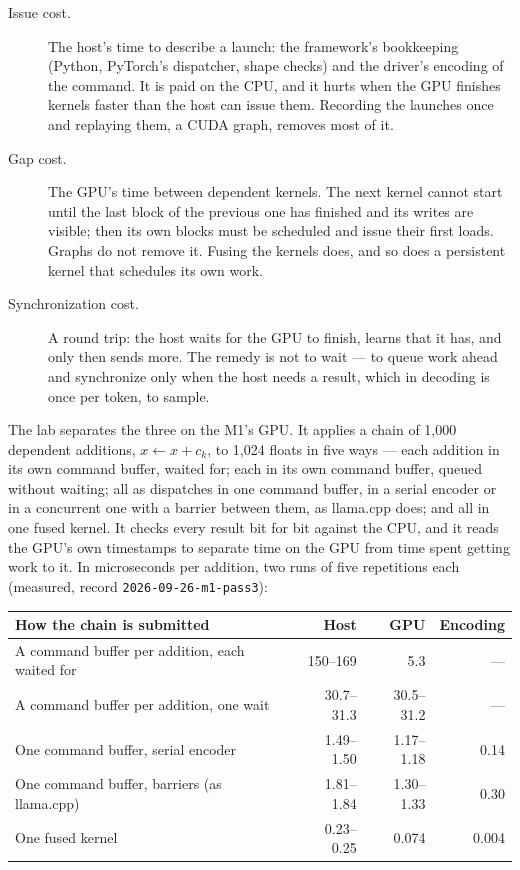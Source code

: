 \begin{description}
\item[Issue cost.] The host's time to describe a launch: the framework's
bookkeeping (Python, PyTorch's dispatcher, shape checks) and the driver's
encoding of the command. It is paid on the CPU, and it hurts when the GPU
finishes kernels faster than the host can issue them. Recording the launches
once and replaying them, a CUDA graph, removes most of it.
\item[Gap cost.] The GPU's time between dependent kernels. The next kernel
cannot start until the last block of the previous one has finished and its
writes are visible; then its own blocks must be scheduled and issue their
first loads. Graphs do not remove it. Fusing the kernels does, and so does a
persistent kernel that schedules its own work.
\item[Synchronization cost.] A round trip: the host waits for the GPU to
finish, learns that it has, and only then sends more. The remedy is not to
wait --- to queue work ahead and synchronize only when the host needs a
result, which in decoding is once per token, to sample.
\end{description}

The lab separates the three on the M1's GPU. It applies a chain of 1,000
dependent additions, $x \leftarrow x + c_k$, to 1,024 floats in five ways ---
each addition in its own command buffer, waited for; each in its own command
buffer, queued without waiting; all as dispatches in one command buffer, in a
serial encoder or in a concurrent one with a barrier between them, as llama.cpp
does; and all in one fused kernel. It checks every result bit for bit against
the CPU, and it reads the GPU's own timestamps to separate time on the GPU from
time spent getting work to it. In microseconds per addition, two runs of five
repetitions each (measured, record \texttt{2026-09-26-m1-pass3}):

\begin{center}\small
\begin{tabular}{@{}lrrr@{}}
\toprule
How the chain is submitted & Host & GPU & Encoding \\
\midrule
A command buffer per addition, each waited for & 150--169 & 5.3 & --- \\
A command buffer per addition, one wait & 30.7--31.3 & 30.5--31.2 & --- \\
One command buffer, serial encoder & 1.49--1.50 & 1.17--1.18 & 0.14 \\
One command buffer, barriers (as llama.cpp) & 1.81--1.84 & 1.30--1.33 & 0.30 \\
One fused kernel & 0.23--0.25 & 0.074 & 0.004 \\
\bottomrule
\end{tabular}
\end{center}

